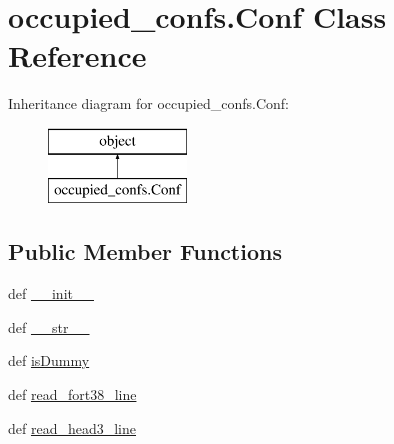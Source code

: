 \hypertarget{classoccupied__confs_1_1_conf}{\section{occupied\-\_\-confs.\-Conf Class Reference}
\label{classoccupied__confs_1_1_conf}
}
Inheritance diagram for occupied\-\_\-confs.\-Conf\-:\begin{figure}[H]
\begin{center}
\leavevmode
\includegraphics[height=2.000000cm]{classoccupied__confs_1_1_conf}
\end{center}
\end{figure}
\subsection*{Public Member Functions}
\begin{DoxyCompactItemize}
\item 
def \hyperlink{classoccupied__confs_1_1_conf_aa0dd7bf79293835ed9e9049b4096d5df}{\-\_\-\-\_\-init\-\_\-\-\_\-}
\item 
def \hyperlink{classoccupied__confs_1_1_conf_a86bd2eeb27506e2b4f3558a3965c9830}{\-\_\-\-\_\-str\-\_\-\-\_\-}
\item 
def \hyperlink{classoccupied__confs_1_1_conf_a3d672e0b7ba077097cbb121a5511fc1c}{is\-Dummy}
\item 
def \hyperlink{classoccupied__confs_1_1_conf_a29f61ef9aeb27bbd84df3cb668b46d4c}{read\-\_\-fort38\-\_\-line}
\item 
def \hyperlink{classoccupied__confs_1_1_conf_a841115a333f8d567defc2b67603ca37b}{read\-\_\-head3\-\_\-line}
\end{DoxyCompactItemize}
